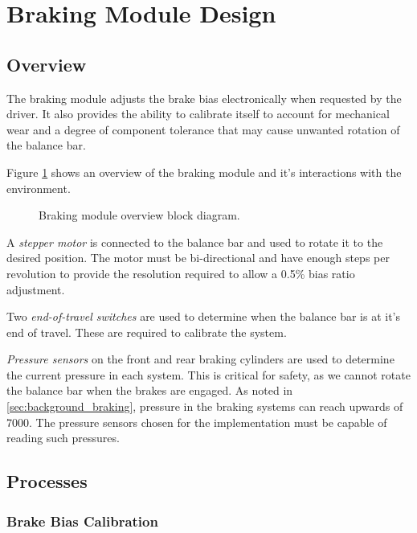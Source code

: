 \section{Braking Module Design\label{sec:Braking-Module-Design}}

\subsection{Overview}

The braking module adjusts the brake bias electronically when requested by the driver. It also provides the ability to calibrate itself to account for mechanical wear and a degree of component tolerance that may cause unwanted rotation of the balance bar. 

Figure \ref{fig:design_brake_overview_block} shows an overview of the braking module and it's interactions with the environment. 

\begin{figure}[H]
	\centering
	
	\caption{Braking module overview block diagram.}
	\label{fig:design_brake_overview_block}
\end{figure}

A \emph{stepper motor} is connected to the balance bar and used to rotate it to the desired position. The motor must be bi-directional and have enough steps per revolution to provide the resolution required to allow a 0.5\% bias ratio adjustment.

Two \emph{end-of-travel switches} are used to determine when the balance bar is at it's end of travel. These are required to calibrate the system. 

\emph{Pressure sensors} on the front and rear braking cylinders are used to determine the current pressure in each system. This is critical for safety, as we cannot rotate the balance bar when the brakes are engaged. As noted in \ref{sec:background_braking}, pressure in the braking systems can reach upwards of \unit{7000}{\kilo\pascal}. The pressure sensors chosen for the implementation must be capable of reading such pressures.

\subsection{Processes}

\subsubsection{Brake Bias Calibration}

